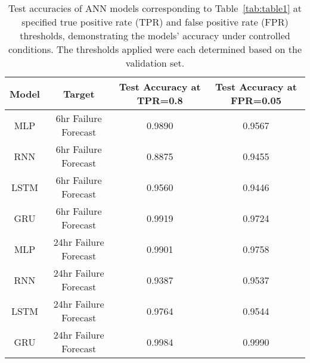 \documentclass{article}
\begin{document}
\begin{table}[!htbp]
    \centering
    \renewcommand{\arraystretch}{1.1}
    \begin{tabular}{|cccc|}
    \hline
    \rowcolor[HTML]{C0C0C0} 
    \cellcolor[HTML]{C0C0C0}\textbf{Model} & \textbf{Target}       & \textbf{Test Accuracy at TPR=0.8} & \textbf{Test Accuracy at FPR=0.05} \\ \hline
    MLP                                    & 6hr Failure Forecast  & 0.9890                                & 0.9567                                 \\
    RNN                                    & 6hr Failure Forecast  & 0.8875                           & 0.9455                            \\
    LSTM                                   & 6hr Failure Forecast  & 0.9560                           & 0.9446                            \\
    GRU                                    & 6hr Failure Forecast  & 0.9919                           & 0.9724                            \\
    MLP                                    & 24hr Failure Forecast & 0.9901                                & 0.9758                                 \\
    RNN                                    & 24hr Failure Forecast & 0.9387                           & 0.9537                            \\
    LSTM                                   & 24hr Failure Forecast & 0.9764                           & 0.9544                            \\
    GRU                                    & 24hr Failure Forecast & 0.9984                           & 0.9990                            \\ \hline
    \end{tabular}
    \caption{Test accuracies of ANN models corresponding to Table~\ref{tab:table1} at specified true positive rate (TPR) and false positive rate (FPR) thresholds, demonstrating the models' accuracy under controlled conditions. The thresholds applied were each determined based on the validation set.}
\end{table}
\end{document}
